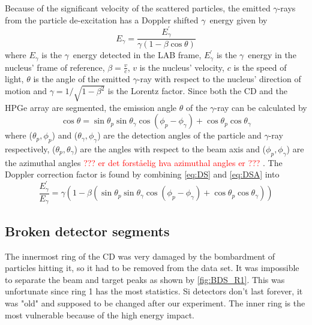 \documentclass[twoside,english]{uiofysmaster/uiofysmaster}
\newcommand{\ga}{$\gamma$}
\let\orgautoref\autoref
\renewcommand{\autoref}
        {%
		 \def\sectionautorefname{Section}%
		 \def\subsectionautorefname{Section}%
		 \def\subsubsectionautorefname{Section}%
		 \def\chapterautorefname{Chapter}%
          \orgautoref}
\begin{document}
Because of the significant velocity of the scattered particles, the emitted \ga-rays from the particle de-excitation has a Doppler shifted \ga\ energy given by 
\begin{equation}\label{eq:DS}
	E_\gamma = \frac{E_\gamma^{'}}{\gamma (1 - \beta \cos \theta)}
\end{equation}
where $E_\gamma$ is the \ga\ energy detected in the LAB frame, $E_\gamma^{'}$ is the \ga\ energy in the nucleus' frame of reference, $\beta = \frac{v}{c}$, $v$ is the nucleus' velocity, $c$ is the speed of light, $\theta$ is the angle of the emitted \ga-ray with respect to the nucleus' direction of motion and $\gamma = 1/\sqrt{1 - \beta^2}$ is the Lorentz factor. Since both the CD and the HPGe array are segmented, the emission angle $\theta$ of the \ga-ray can be calculated by 
\begin{equation}\label{eq:DSA}
	\cos \theta = \sin \theta_p \sin \theta_\gamma \cos (\phi_p - \phi_\gamma) + \cos \theta_p \cos \theta_\gamma
\end{equation}
where ($\theta_p, \phi_p$) and ($\theta_\gamma, \phi_\gamma$) are the detection angles of the particle and \ga-ray respectively, ($\theta_p, \theta_\gamma$) are the angles with respect to the beam axis and ($\phi_p, \phi_\gamma$) are the azimuthal angles \textcolor{red}{??? er det forståelig hva azimuthal angles er ???} \cite{RIBF2012, MB-spect}. The Doppler correction factor is found by combining \autoref{eq:DS} and \autoref{eq:DSA} into
\begin{equation}
	\frac{E_\gamma^{'}}{E_\gamma} = \gamma (1 - \beta (\sin \theta_p \sin \theta_\gamma \cos (\phi_p - \phi_\gamma) + \cos \theta_p \cos \theta_\gamma))
\end{equation}





\subsection{Broken detector segments}\label{sec:BDS}
The innermost ring of the CD was very damaged by the bombardment of particles hitting it, so it had to be removed from the data set. 
It was impossible to separate the beam and target peaks as shown by \autoref{fig:BDS_R1}.
This was unfortunate since ring 1 has the most statistics. 
Si detectors don't last forever, it was "old" and supposed to be changed after our experiment. 
The inner ring is the most vulnerable because of the high energy impact. 
\end{document}
